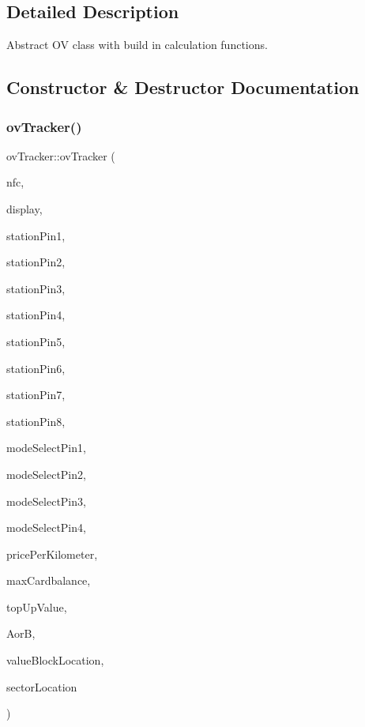 \subsection{Detailed Description}
Abstract OV class with build in calculation functions. 

\subsection{Constructor \& Destructor Documentation}
\mbox{\label{classovTracker_a040c753cf8d2bce0921cb9996738b66c}} 
\subsubsection{\texorpdfstring{ov\+Tracker()}{ovTracker()}}
{\footnotesize\ttfamily ov\+Tracker\+::ov\+Tracker (\begin{DoxyParamCaption}\item[{\hyperlink{classnfc_1_1NFC}{nfc\+::\+N\+FC} \&}]{nfc,  }\item[{hwlib\+::terminal\+\_\+from \&}]{display,  }\item[{hwlib\+::pin\+\_\+in \&}]{station\+Pin1,  }\item[{hwlib\+::pin\+\_\+in \&}]{station\+Pin2,  }\item[{hwlib\+::pin\+\_\+in \&}]{station\+Pin3,  }\item[{hwlib\+::pin\+\_\+in \&}]{station\+Pin4,  }\item[{hwlib\+::pin\+\_\+in \&}]{station\+Pin5,  }\item[{hwlib\+::pin\+\_\+in \&}]{station\+Pin6,  }\item[{hwlib\+::pin\+\_\+in \&}]{station\+Pin7,  }\item[{hwlib\+::pin\+\_\+in \&}]{station\+Pin8,  }\item[{hwlib\+::pin\+\_\+in \&}]{mode\+Select\+Pin1,  }\item[{hwlib\+::pin\+\_\+in \&}]{mode\+Select\+Pin2,  }\item[{hwlib\+::pin\+\_\+in \&}]{mode\+Select\+Pin3,  }\item[{hwlib\+::pin\+\_\+in \&}]{mode\+Select\+Pin4,  }\item[{float}]{price\+Per\+Kilometer,  }\item[{int}]{max\+Cardbalance,  }\item[{int}]{top\+Up\+Value,  }\item[{\hyperlink{declarations_8h_a305b1a3bcfca65e2a82f0f9d24676835}{nfc\+::mifare\+Commands}}]{AorB,  }\item[{uint8\+\_\+t}]{value\+Block\+Location,  }\item[{uint8\+\_\+t}]{sector\+Location }\end{DoxyParamCaption})}



